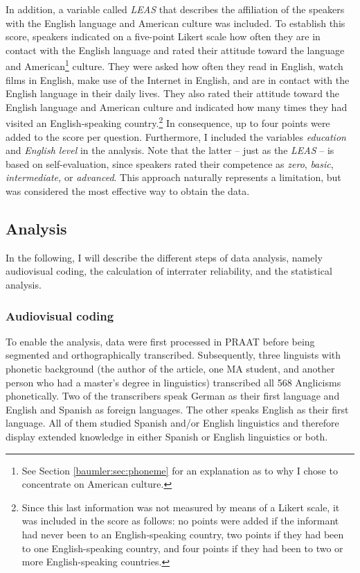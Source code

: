 \documentclass[output=paper]{langscibook}
\begin{document}
In addition, a variable called \textit{\gls*{LEAS}} that describes the affiliation of the speakers with the English language and American culture was included. To establish this score, speakers indicated on a five-point Likert scale how often they are in contact with the English language and rated their attitude toward the language and American\footnote{ See Section \ref{baumler:sec:phoneme} for an explanation as to why I chose to concentrate on American culture.} culture. They were asked how often they read in English, watch films in English, make use of the Internet in English, and are in contact with the English language in their daily lives. They also rated their attitude toward the English language and American culture and indicated how many times they had visited an English-speaking country.\footnote{ Since this last information was not measured by means of a Likert scale, it was included in the score as follows: no points were added if the informant had never been to an English-speaking country, two points if they had been to one English-speaking country, and four points if they had been to two or more English-speaking countries.} In consequence, up to four points were added to the score per question. Furthermore, I included the variables \textit{education} and \textit{English level} in the analysis. Note that the latter – just as the \textit{\gls*{LEAS}} – is based on self-evaluation, since speakers rated their competence as \textit{zero}, \textit{basic}, \textit{intermediate,} or \textit{advanced}. This approach naturally represents a limitation, but was considered the most effective way to obtain the data. 

\subsection{Analysis}
In the following, I will describe the different steps of data analysis, namely audiovisual coding, the calculation of interrater reliability, and the statistical analysis.

\subsubsection{Audiovisual coding}
To enable the analysis, data were first processed in PRAAT \citep[]{Boersma2021} before being segmented and orthographically transcribed. Subsequently, three linguists with phonetic background (the author of the article, one MA student, and another person who had a master's degree in linguistics) transcribed all 568 Anglicisms phonetically. Two of the transcribers speak German as their first language and English and Spanish as foreign languages. The other speaks English as their first language. All of them studied Spanish and/or English linguistics and therefore display extended knowledge in either Spanish or English linguistics or both.
\end{document}

